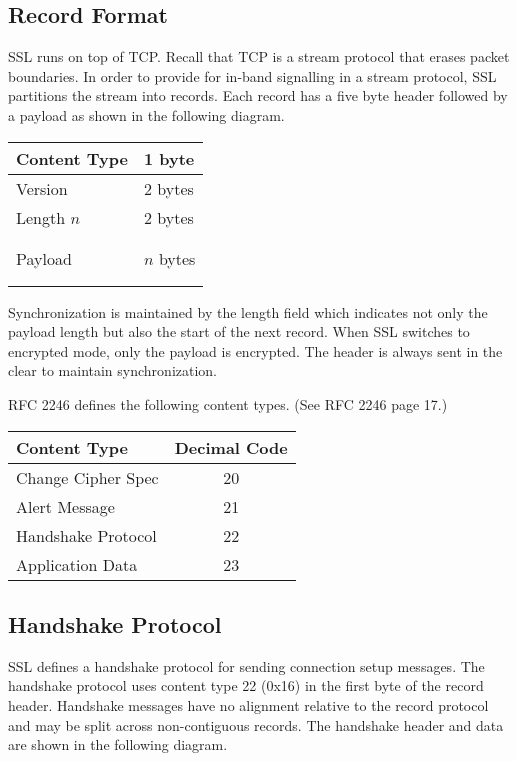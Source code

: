 \documentclass[12pt]{article}
\begin{document}
\subsection*{Record Format}

SSL runs on top of TCP.
Recall that TCP is a stream protocol that erases packet boundaries.
In order to provide for in-band signalling in a stream protocol,
SSL partitions the stream into records.
Each record has a five byte header followed by a payload as shown
in the following diagram.

\begin{center}
\begin{tabular}{|ll|}
\hline
Content Type & 1 byte\\
\hline
Version & 2 bytes\\
\hline
Length $n$ & 2 bytes\\
\hline
&\\
&\\
Payload & $n$ bytes\\
&\\
&\\
\hline
\end{tabular}
\end{center}

Synchronization is maintained by the length field which indicates not only
the payload length but also the start of the next record.
When SSL switches to encrypted mode, only the payload is encrypted.
The header is always sent in the clear to maintain synchronization.

\bigskip
RFC 2246 defines the following content types. (See RFC 2246 page 17.)

\begin{center}
\begin{tabular}{|l|c|}
\hline
Content Type & Decimal Code\\
\hline
Change Cipher Spec & 20\\
Alert Message & 21\\
Handshake Protocol & 22\\
Application Data & 23\\
\hline
\end{tabular}
\end{center}

\subsection*{Handshake Protocol}

SSL defines a handshake protocol for sending connection setup messages.
The handshake protocol uses content type 22 (0x16) in the
first byte of the record header.
Handshake messages have no alignment relative to the record protocol
and may be split across non-contiguous records.
The handshake header and data are shown in the following diagram.
\end{document}
